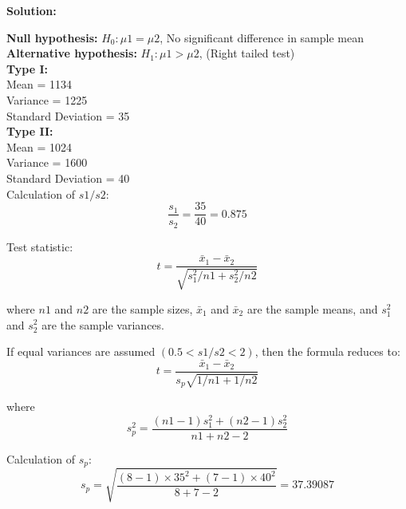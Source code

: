 \documentclass[a4paper,11pt,openright]{report}
\begin{document}
\begin{enumerate}
\textbf{Solution:}

\textbf{Null hypothesis:} $H_{0}: \mu 1 = \mu 2$, \hspace{2px} No significant difference in
sample mean \\
\textbf{Alternative hypothesis:} $H_{1}: \mu 1 > \mu 2$, \hspace{2px} (Right tailed test) \\

\textbf{Type I:} \\
\hspace*{10mm} Mean = 1134 \\
\hspace*{10mm} Variance = 1225 \\
\hspace*{10mm} Standard Deviation = 35 \\

\textbf{Type II:} \\
\hspace*{10mm} Mean = 1024 \\
\hspace*{10mm} Variance = 1600 \\
\hspace*{10mm} Standard Deviation = 40 \\

Calculation of $s1/s2$:
\begin{equation*}
\frac{s_{1}}{s_{2}} = \frac{35}{40} = 0.875
\end{equation*}

Test statistic: 
\begin{equation*}
t = \frac{\bar x_{1} - \bar x_{2}}{\sqrt{s_{1}^{2}/n1 + s_{2}^{2}/n2}}
\end{equation*}

where $n1$ and $n2$ are the sample sizes, $\bar x_{1}$ and $\bar x_{2}$ are the sample
means, and $s_{1}^{2}$ and $s_{2}^{2}$ are the sample variances. 

If equal variances are assumed $(0.5 < s1/s2 < 2)$, then the formula reduces to:
\begin{equation*}
t = \frac{\bar x_{1} - \bar x_{2}}{s_{p} \sqrt{1/n1 + 1/n2}}
\end{equation*}

where
\begin{equation*}
s_{p}^{2} = \frac{(n1-1)s_{1}^{2} + (n2-1)s_{2}^{2}}{n1+n2-2}
\end{equation*}

Calculation of $s_{p}$:
\begin{equation*}
s_{p} = \sqrt{\frac{(8-1) \times 35^{2} + (7-1) \times 40^{2}}{8+7-2}} 
      = 37.39087
\end{equation*}


\end{enumerate}
\end{document}
